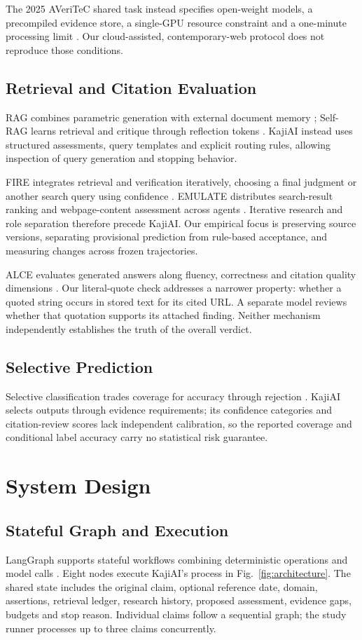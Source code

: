\documentclass[conference]{IEEEtran}
\begin{document}
The 2025 AVeriTeC shared task instead specifies open-weight models, a precompiled evidence store, a single-GPU resource constraint and a one-minute processing limit \cite{sharedtask2025}. Our cloud-assisted, contemporary-web protocol does not reproduce those conditions.

\subsection{Retrieval and Citation Evaluation}
RAG combines parametric generation with external document memory \cite{rag}; Self-RAG learns retrieval and critique through reflection tokens \cite{selfrag}. KajiAI instead uses structured assessments, query templates and explicit routing rules, allowing inspection of query generation and stopping behavior.

FIRE integrates retrieval and verification iteratively, choosing a final judgment or another search query using confidence \cite{fire}. EMULATE distributes search-result ranking and webpage-content assessment across agents \cite{emulate}. Iterative research and role separation therefore precede KajiAI. Our empirical focus is preserving source versions, separating provisional prediction from rule-based acceptance, and measuring changes across frozen trajectories.

ALCE evaluates generated answers along fluency, correctness and citation quality dimensions \cite{alce}. Our literal-quote check addresses a narrower property: whether a quoted string occurs in stored text for its cited URL. A separate model reviews whether that quotation supports its attached finding. Neither mechanism independently establishes the truth of the overall verdict.

\subsection{Selective Prediction}
Selective classification trades coverage for accuracy through rejection \cite{selective}. KajiAI selects outputs through evidence requirements; its confidence categories and citation-review scores lack independent calibration, so the reported coverage and conditional label accuracy carry no statistical risk guarantee.

\section{System Design}
\subsection{Stateful Graph and Execution}
LangGraph supports stateful workflows combining deterministic operations and model calls \cite{langgraph}. Eight nodes execute KajiAI's process in Fig.~\ref{fig:architecture}. The shared state includes the original claim, optional reference date, domain, assertions, retrieval ledger, research history, proposed assessment, evidence gaps, budgets and stop reason. Individual claims follow a sequential graph; the study runner processes up to three claims concurrently.
\end{document}
